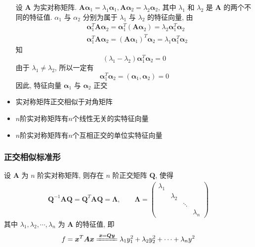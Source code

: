 \documentclass{article}
\begin{document}
\begin{itemize}
					设 $\boldsymbol{A}$ 为实对称矩阵. $\boldsymbol{A} \boldsymbol{\alpha}_{1}=\lambda_{1} \boldsymbol{\alpha}_{1}, \boldsymbol{A} \boldsymbol{\alpha}_{2}=\lambda_{2} \boldsymbol{\alpha}_{2}$, 其中 $\lambda_{1}$ 和 $\lambda_{2}$ 是 $\boldsymbol{A}$ 的两个不同的特征值. $\alpha_{1}$ 与 $\alpha_{2}$ 分别为属于 $\lambda_{1}$ 与 $\lambda_{2}$ 的特征向量, 由
					$$
					\begin{aligned}
						&\boldsymbol{\alpha}_{1}^{T} \boldsymbol{A} 	\boldsymbol{\alpha}_{2}=\boldsymbol{\alpha}_{1}^{T}\left(\boldsymbol{A} \boldsymbol{\alpha}_{2}\right)=\lambda_{2} \boldsymbol{\alpha}_{1}^{T} \boldsymbol{\alpha}_{2} \\
						&\boldsymbol{\alpha}_{1}^{T} \boldsymbol{A} \boldsymbol{\alpha}_{2}=\left(\boldsymbol{A} 	\boldsymbol{\alpha}_{1}\right)^{T} \boldsymbol{\alpha}_{2}=\lambda_{1} \boldsymbol{\alpha}_{1}^{T} \boldsymbol{\alpha}_{2}
					\end{aligned}
					$$
					知
					$$
					\left(\lambda_{1}-\lambda_{2}\right) \boldsymbol \alpha_{1}^{T} \boldsymbol \alpha_{2}=0
					$$
					由于 $\lambda_{1} \neq \lambda_{2}$, 所以一定有
					$$
					\boldsymbol{\alpha}_{1}^{T} \boldsymbol{\alpha}_{2}=\left(\boldsymbol{\alpha}_{1}, 	\boldsymbol{\alpha}_{2}\right)=0
					$$
					因此, 特征向量 $\boldsymbol \alpha_{1}$ 与 $\boldsymbol \alpha_{2}$ 正交
					\item 实对称矩阵正交相似于对角矩阵
					\item $n$阶实对称矩阵有$n$个线性无关的实特征向量
					\item $n$阶实对称矩阵有$n$个互相正交的单位实特征向量
				\end{itemize}
			\subsubsection{正交相似标准形}
				设 $\boldsymbol{A}$ 为 $n$ 阶实对称矩阵, 则存在 $n$ 阶正交矩阵 $\boldsymbol{Q}$, 使得
				$$
				\begin{gathered}
					\boldsymbol Q^{-1}\boldsymbol A \boldsymbol Q=\boldsymbol Q^{T} \boldsymbol A \boldsymbol Q=\boldsymbol \Lambda,\qquad
					\boldsymbol{\Lambda}=\left(\begin{array}{llll}
						\lambda_{1} & & & \\
						& \lambda_{2} & & \\
						& & \ddots & \\
						& & & \lambda_{n}
					\end{array}\right)
				\end{gathered}
				$$
				其中 $\lambda_{1}, \lambda_{2}, \cdots, \lambda_{n}$ 为 $\boldsymbol{A}$ 的特征值, 即
				$$
				f=\boldsymbol{x}^{T} \boldsymbol{A} \boldsymbol{x} \xlongequal{\boldsymbol{x}=\boldsymbol{Q} \boldsymbol y} \lambda_{1} y_{1}^{2}+\lambda_{2} y_{2}^{2}+\cdots+\lambda_{n} y^{2}
				$$
\end{document}
